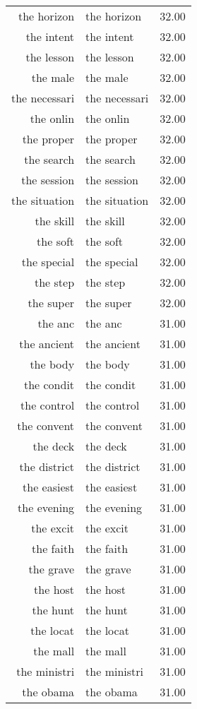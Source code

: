 \begin{table}[ht]
\begin{tabular}{rlr}
  the horizon & the horizon & 32.00 \\ 
  the intent & the intent & 32.00 \\ 
  the lesson & the lesson & 32.00 \\ 
  the male & the male & 32.00 \\ 
  the necessari & the necessari & 32.00 \\ 
  the onlin & the onlin & 32.00 \\ 
  the proper & the proper & 32.00 \\ 
  the search & the search & 32.00 \\ 
  the session & the session & 32.00 \\ 
  the situation & the situation & 32.00 \\ 
  the skill & the skill & 32.00 \\ 
  the soft & the soft & 32.00 \\ 
  the special & the special & 32.00 \\ 
  the step & the step & 32.00 \\ 
  the super & the super & 32.00 \\ 
  the anc & the anc & 31.00 \\ 
  the ancient & the ancient & 31.00 \\ 
  the body & the body & 31.00 \\ 
  the condit & the condit & 31.00 \\ 
  the control & the control & 31.00 \\ 
  the convent & the convent & 31.00 \\ 
  the deck & the deck & 31.00 \\ 
  the district & the district & 31.00 \\ 
  the easiest & the easiest & 31.00 \\ 
  the evening & the evening & 31.00 \\ 
  the excit & the excit & 31.00 \\ 
  the faith & the faith & 31.00 \\ 
  the grave & the grave & 31.00 \\ 
  the host & the host & 31.00 \\ 
  the hunt & the hunt & 31.00 \\ 
  the locat & the locat & 31.00 \\ 
  the mall & the mall & 31.00 \\ 
  the ministri & the ministri & 31.00 \\ 
  the obama & the obama & 31.00 \\ 

\end{tabular}
\end{table}
